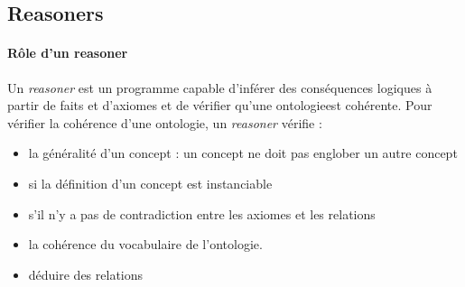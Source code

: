 \documentclass {report}
\begin{document}

\subsection{Reasoners}
\paragraph{Rôle d'un reasoner}
Un \textit{reasoner} est un programme capable d'inférer des conséquences logiques à partir de faits et d'axiomes et de vérifier qu'une ontologie\footnotemark[1] est cohérente. Pour vérifier la cohérence d'une ontologie, un \textit{reasoner} vérifie : 
\begin{itemize}
\item la généralité d'un concept : un concept ne doit pas englober un autre concept
\item si la définition d'un concept est instanciable
\item s'il n'y a pas de contradiction entre les axiomes et les relations
\item la cohérence du vocabulaire de l'ontologie.
\item déduire des relations
\end{itemize}
\end{document}
